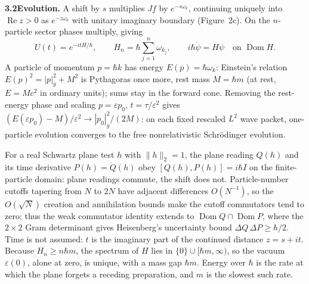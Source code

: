 \documentclass[10pt,a4paper]{article}
\newcommand{\Dom}{\operatorname{Dom}}
\newcommand{\RePart}{\operatorname{Re}}
\begin{document}
\vspace{3pt}
\noindent\textbf{3.2\enspace Evolution.} A shift by $s$ multiplies $Jf$ by $e^{-s\omega_k}$, continuing uniquely into $\RePart z > 0$ as $e^{-z\omega_k}$ with unitary imaginary boundary (Figure~2c). On the $n$-particle sector phases multiply, giving
\begin{equation}
  U(t) = e^{-itH/\hbar}, \qquad H_n = \hbar\sum_{j=1}^n \omega_{k_j}, \qquad i\hbar\dot\psi = H\psi \quad \text{on } \Dom H.
\end{equation}
A particle of momentum $p = \hbar k$ has energy $E(p) = \hbar\omega_k$: Einstein's relation $E(p)^2 = |p|_g^2 + M^2$ is Pythagoras once more, rest mass $M = \hbar m$ (at rest, $E = Mc^2$ in ordinary units); sums stay in the forward cone. Removing the rest-energy phase and scaling $p = \varepsilon p_0$, $t = \tau/\varepsilon^2$ gives $(E(\varepsilon p_0) - M)/\varepsilon^2 \to |p_0|_g^2/(2M)$: on each fixed rescaled $L^2$ wave packet, one-particle evolution converges to the free nonrelativistic Schr\"odinger evolution.

For a real Schwartz plane test $h$ with $\|h\|_2 = 1$, the plane reading $Q(h)$ and its time derivative $P(h) = \dot{Q}(h)$ obey $[Q(h), P(h)] = i\hbar I$ on the finite-particle domain: plane readings commute, the shift does not. Particle-number cutoffs tapering from $N$ to $2N$ have adjacent differences $O(N^{-1})$, so the $O(\sqrt{N})$ creation and annihilation bounds make the cutoff commutators tend to zero; thus the weak commutator identity extends to $\Dom Q \cap \Dom P$, where the $2\times 2$ Gram determinant gives Heisenberg's uncertainty bound $\Delta Q\,\Delta P \ge \hbar/2$. Time is not assumed: $t$ is the imaginary part of the continued distance $z = s + it$. Because $H_n \ge n\hbar m$, the spectrum of $H$ lies in $\{0\} \cup [\hbar m, \infty)$, so the vacuum $\varepsilon(0)$, alone at zero, is unique, with a mass gap $\hbar m$. Energy over $\hbar$ is the rate at which the plane forgets a receding preparation, and $m$ is the slowest such rate.
\end{document}
